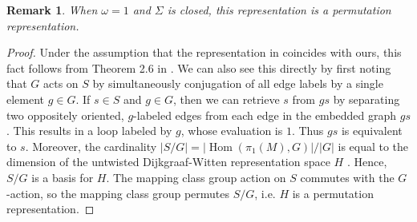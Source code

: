 \documentclass{amsart}
\newtheorem{rmk}[thm]{Remark}
\DeclareMathOperator{\Hom}{Hom}
\newcommand{\Si}{\Sigma}
\begin{document}
\begin{rmk} 
When $\omega = 1$ and $\Si$ is closed, this representation is a permutation representation.  
\end{rmk}

\begin{proof}
Under the assumption that the representation in \cite{fjfu} coincides with ours, this fact follows from Theorem 2.6 in \cite{fjfu}.  We can also see this directly by first noting that $G$ acts on $S$ by simultaneously conjugation of all edge labels by a single element $g \in G$.  If $s \in S$ and $g \in G$, then we can retrieve $s$ from $gs$ by separating two oppositely oriented, $g$-labeled edges from each edge in the embedded graph $gs$.  This results in a loop labeled by $g$, whose evaluation is $1$.  Thus $gs$ is equivalent to $s$.  Moreover, the cardinality $|S/G| = |\Hom(\pi_1(M), G)|/|G|$ is equal to the dimension of the untwisted Dijkgraaf-Witten representation space $H$ \cite{dijkgraaf1990}.  Hence, $S/G$ is a basis for $H$.  The mapping class group action on $S$ commutes with the $G$-action, so the mapping class group permutes $S/G$, i.e. $H$ is a permutation representation.
\end{proof}

\newcommand{\nc}{\newcommand}
\newcommand{\rnc}{\renewcommand}


     \nc{\lcx}{-0.5}
     \nc{\lcy}{0.866}
     \nc{\rcx}{-\lcx}
     \nc{\rcy}{\lcy}

     \nc{\makeBdy}{
       \begin{scope}[very thick,decoration={
             markings,
             mark=at position 0.5 with {\arrow{>}}}
         ]  

         \draw (-1,0) -- (\lcx, \lcy); 
         \draw (\lcx, \lcy) -- (\rcx, \rcy); 
         \draw  (1, 0) -- (\rcx, \rcy);
       \end{scope}
     }

    \nc{\lcutx}{-0.6}
    \nc{\lcuty}{0.6928}
    \nc{\lcut}{(\lcutx, \lcuty)}
    \nc{\rcutx}{-\lcutx}
    \nc{\rcuty}{\lcuty}
    \nc{\rcut}{(\rcutx, \rcuty)}

    \nc{\mvx}{0}
    \nc{\mvy}{0.2}
    \nc{\mv}{(\mvx, \mvy)}

    \nc{\outEdge}{\draw[postaction={decorate}]  (0, 0) -- \mv node[pos=.5, right]{$hgh^{-1}$};}
\end{document}
